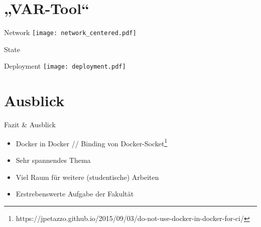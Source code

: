 \documentclass[compress]{beamer}
\begin{document}
\section{„VAR-Tool“}
\begin{frame}{Network}
  \texttt{[image: network\_centered.pdf]}
\end{frame}
\begin{frame}{State}
\end{frame}
\begin{frame}{Deployment}
  \texttt{[image: deployment.pdf]}
\end{frame}

\section{Ausblick}
\begin{frame}{Fazit \& Ausblick}
  \begin{itemize}
    \item Docker in Docker // Binding von Docker-Socket\footnote{https://jpetazzo.github.io/2015/09/03/do-not-use-docker-in-docker-for-ci/}
  \end{itemize}
  \begin{itemize}
    \item Sehr spannendes Thema
    \item Viel Raum für weitere (studentische) Arbeiten
    \item Erstrebenswerte Aufgabe der Fakultät
  \end{itemize}
\end{frame}

\end{document}
